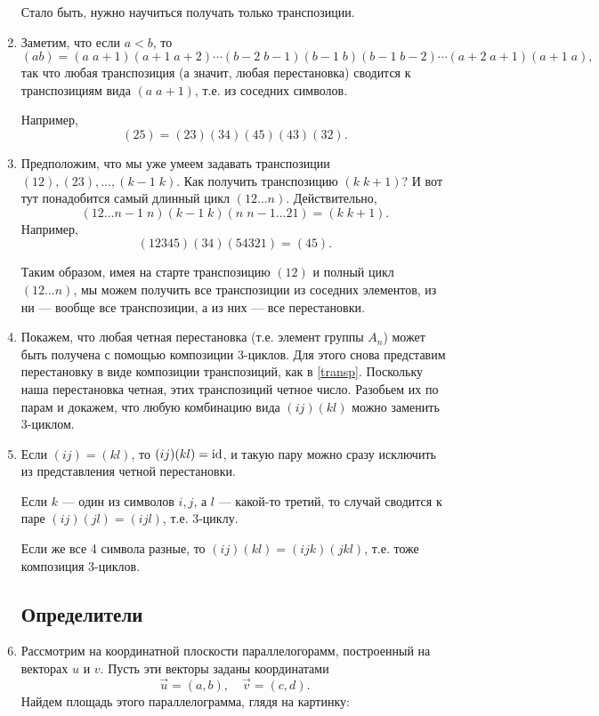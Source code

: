 \begin{enumerate}
Стало быть, нужно научиться получать только транспозиции.
\item Заметим, что если $a<b$, то
$$
(ab)=(a\;a+1)(a+1\;a+2)\cdots(b-2\; b-1)(b-1\;b)(b-1\; b-2)\cdots(a+2\;a+1)(a+1\;a),
$$
так что любая транспозиция (а значит, любая перестановка) сводится к транспозициям вида $(a\;a+1)$, т.е. из соседних символов.

Например,
$$
(25) = (23)(34)(45)(43)(32).
$$
\item Предположим, что мы уже умеем задавать транспозиции $(12),(23),\dots,(k-1\;k)$. Как получить транспозицию $(k\;k+1)$? И вот тут понадобится самый длинный цикл $(12\dots n)$. Действительно,
$$
(12\dots n-1\; n)(k-1\;k)(n\;n-1\dots 21)=(k\;k+1).
$$
Например,
$$
(12345)(34)(54321)=(45).
$$

Таким образом, имея на старте транспозицию $(12)$ и полный цикл $(12\dots n)$, мы можем получить все транспозиции из соседних элементов, из ни --- вообще все транспозиции, а из них --- все перестановки.

\item Покажем, что любая четная перестановка (т.е. элемент группы $A_n$) может быть получена с помощью композиции 3-циклов.
Для этого снова представим перестановку в виде композиции транспозиций, как в \eqref{transp}. Поскольку наша перестановка четная, этих транспозиций четное число. Разобьем их по парам и докажем, что любую комбинацию вида $(ij)(kl)$ можно заменить 3-циклом.

\item Если $(ij)=(kl)$, то $(ij)(kl)=\mathrm{id}$, и такую пару можно сразу исключить из представления четной перестановки.

Если $k$ --- один из символов $i,j$, а $l$ --- какой-то третий, то случай сводится к паре $(ij)(jl)=(ijl)$, т.е. 3-циклу.

Если же все 4 символа разные, то $(ij)(kl)=(ijk)(jkl)$, т.е. тоже композиция 3-циклов.


\subsection*{Определители}

\item Рассмотрим на координатной плоскости параллелогорамм, построенный на векторах $u$ и $v$. Пусть эти векторы заданы координатами
$$
\vec u=(a,b),\quad \vec v=(c,d).
$$
Найдем площадь этого параллелограмма, глядя на картинку:


\end{enumerate}

